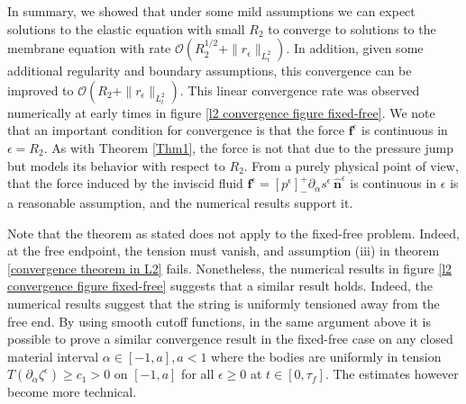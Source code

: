 \documentclass{article}[12pt]
\theoremstyle{Theorem}
\begin{document}
In summary, we showed that under some mild assumptions we can expect solutions to the elastic equation with small $R_2$ to converge to solutions to the membrane equation with rate $\mathcal{O}(R_2^{1/2} + \|r_\epsilon\|_{L^2_t})$. In addition, given some additional regularity and boundary assumptions, this convergence can be improved to $\mathcal{O}(R_2+ \|r_\epsilon\|_{L^2_t})$. This linear convergence rate was observed numerically at early times in figure \ref{l2 convergence figure fixed-free}. We note that an important condition for convergence is that the force $\boldsymbol{f}^\epsilon$ is continuous in $\epsilon = R_2$. As with Theorem \ref{Thm1}, the force is not that due to the pressure jump but models its behavior with respect to $R_2$. From a purely physical point of view, that the force induced by the inviscid fluid $\boldsymbol{f}^\epsilon = [p^\epsilon]^+_-\partial_\alpha s^\epsilon\,\hat{\boldsymbol{n}}^\epsilon$ is continuous in $\epsilon$ is a reasonable assumption, and the numerical results support it. 
\newline

Note that the theorem as stated does not apply to the fixed-free problem. Indeed, at the free endpoint, the tension must vanish, and assumption (iii) in theorem \ref{convergence theorem in L2} fails. Nonetheless, the numerical results in figure \ref{l2 convergence figure fixed-free} suggests that a similar result holds. Indeed, the numerical results suggest that the string is uniformly tensioned away from the free end. By using smooth cutoff functions, in the same argument above it is possible to prove a similar convergence result in the fixed-free case on any closed material interval $\alpha \in [-1,a], a<1$ where the bodies are uniformly in tension $T(\partial_\alpha\zeta^\epsilon) \geq c_1 >0$ on $[-1,a]$ for all $\epsilon \geq 0$ at $t\in[0,\tau_f]$. The estimates however become more technical.
\newline
\end{document}

